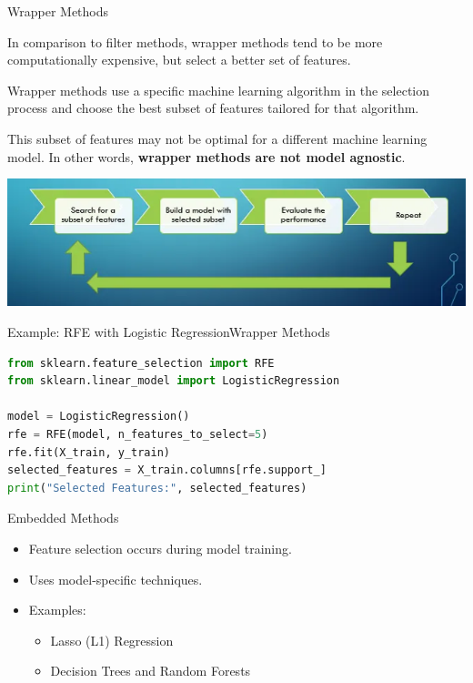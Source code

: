 \documentclass[11pt]{beamer}
\begin{document}
\begin{frame}{Wrapper Methods}
	\begin{itemize}
		\item \footnotesize{In comparison to filter methods, wrapper methods tend to be more computationally expensive, but select a better set of features.
		\item Wrapper methods use a specific machine learning algorithm in the selection process and choose the best subset of features tailored for that algorithm. 
		\item This subset of features may not be optimal for a different machine learning model. In other words, \textbf{wrapper methods are not model agnostic}.}
	\end{itemize}
	\begin{center}
	\includegraphics[scale=0.65]{../05-pictures/lesson-2-2_pic_4.png}
	\end{center}
\end{frame}
%
%
\begin{frame}[fragile]{Example: RFE with Logistic Regression}{Wrapper Methods}
    \begin{lstlisting}[language=Python]
from sklearn.feature_selection import RFE
from sklearn.linear_model import LogisticRegression

model = LogisticRegression()
rfe = RFE(model, n_features_to_select=5)
rfe.fit(X_train, y_train)
selected_features = X_train.columns[rfe.support_]
print("Selected Features:", selected_features)
    \end{lstlisting}
\end{frame}
%
%
\begin{frame}{Embedded Methods}
    \begin{itemize}
        \item Feature selection occurs during model training.
        \item Uses model-specific techniques.
        \item Examples:
        \begin{itemize}
            \item Lasso (L1) Regression
            \item Decision Trees and Random Forests
        \end{itemize}
    \end{itemize}
\end{frame}
\end{document}
